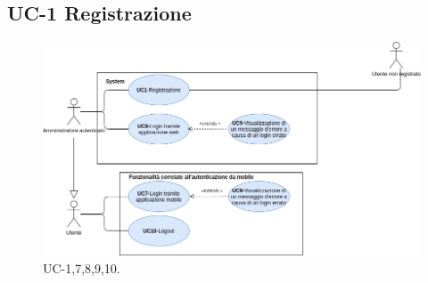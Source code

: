 
\subsection{UC-1 Registrazione}

\begin{figure}[H]
	\centering
	\includegraphics[width=\textwidth]{src/CasiDUso/immagini/Autenticazione.png}
	\caption{UC-1,7,8,9,10.}
\end{figure}

